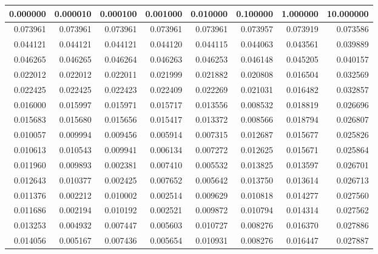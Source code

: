 \begin{tabular}{rrrrrrrr}
\toprule
0.000000 & 0.000010 & 0.000100 & 0.001000 & 0.010000 & 0.100000 & 1.000000 & 10.000000 \\
\midrule
0.073961 & 0.073961 & 0.073961 & 0.073961 & 0.073961 & 0.073957 & 0.073919 & 0.073586 \\
0.044121 & 0.044121 & 0.044121 & 0.044120 & 0.044115 & 0.044063 & 0.043561 & 0.039889 \\
0.046265 & 0.046265 & 0.046264 & 0.046263 & 0.046253 & 0.046148 & 0.045205 & 0.040157 \\
0.022012 & 0.022012 & 0.022011 & 0.021999 & 0.021882 & 0.020808 & 0.016504 & 0.032569 \\
0.022425 & 0.022425 & 0.022423 & 0.022409 & 0.022269 & 0.021031 & 0.016482 & 0.032857 \\
0.016000 & 0.015997 & 0.015971 & 0.015717 & 0.013556 & 0.008532 & 0.018819 & 0.026696 \\
0.015683 & 0.015680 & 0.015656 & 0.015417 & 0.013372 & 0.008566 & 0.018794 & 0.026807 \\
0.010057 & 0.009994 & 0.009456 & 0.005914 & 0.007315 & 0.012687 & 0.015677 & 0.025826 \\
0.010613 & 0.010543 & 0.009941 & 0.006134 & 0.007272 & 0.012625 & 0.015671 & 0.025864 \\
0.011960 & 0.009893 & 0.002381 & 0.007410 & 0.005532 & 0.013825 & 0.013597 & 0.026701 \\
0.012643 & 0.010377 & 0.002425 & 0.007652 & 0.005642 & 0.013750 & 0.013614 & 0.026713 \\
0.011376 & 0.002212 & 0.010002 & 0.002514 & 0.009629 & 0.010818 & 0.014277 & 0.027560 \\
0.011686 & 0.002194 & 0.010192 & 0.002521 & 0.009872 & 0.010794 & 0.014314 & 0.027562 \\
0.013253 & 0.004932 & 0.007447 & 0.005603 & 0.010727 & 0.008276 & 0.016370 & 0.027886 \\
0.014056 & 0.005167 & 0.007436 & 0.005654 & 0.010931 & 0.008276 & 0.016447 & 0.027887 \\
\bottomrule
\end{tabular}
